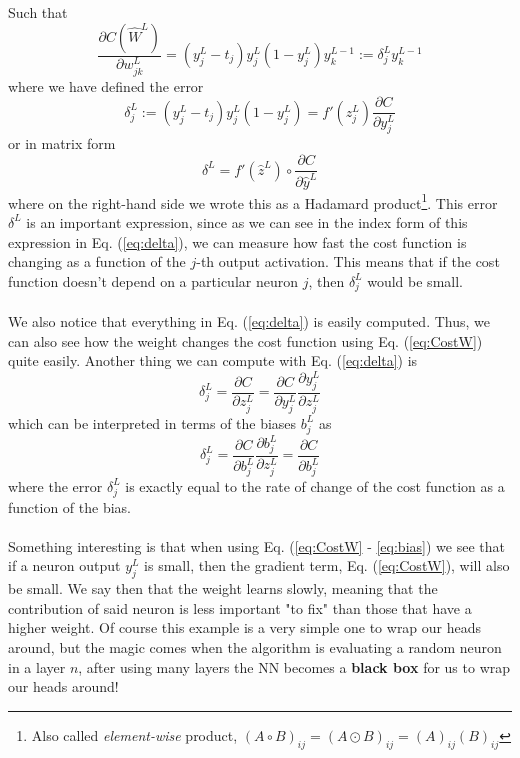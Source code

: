 \documentclass[12pt, a4paper]{book}
\begin{document}
Such that
\begin{equation}\label{eq:CostW}
    \frac{\partial C(\hat W ^L) }{\partial w_{jk}^L}=\left(y_j^L-t_j\right)y_j^L(1-y_j^L)y_k^{L-1} :=\delta_j^Ly_k^{L-1}
\end{equation}
where we have defined the error
\begin{equation}\label{eq:delta}
    \delta_j^L:=\left(y_j^L-t_j\right)y_j^L(1-y_j^L)=f'(z_j^L)\frac{\partial C}{\partial y_j^L} 
\end{equation}
or in matrix form
$$
\delta^L = f'(\hat z ^L)\circ \frac{\partial C}{\partial \hat y ^L}
$$
where on the right-hand side we wrote this as a Hadamard product\footnote{Also called \textit{element-wise} product, $(A\circ B)_{ij} = (A\odot B)_{ij} = (A)_{ij}(B)_{ij}$}. This error $\delta^L$ is an important expression, since as we can see in the index form of this expression in Eq. (\ref{eq:delta}), we can measure how fast 
the cost function is changing as a function of the $j$-th output activation. This means that if the cost function doesn't depend on a particular neuron $j$, then $\delta_j^L$ would be small.  \\
\\We also notice that everything in Eq. (\ref{eq:delta}) is easily computed. Thus, we can also see how the weight changes the cost function using Eq. (\ref{eq:CostW}) quite easily. 
Another thing we can compute with Eq. (\ref{eq:delta}) is
$$
\delta_j^L=\frac{\partial C}{\partial z_j^L} =\frac{\partial C}{\partial y_j^L}\frac{\partial y_j^L}{\partial z_j^L}
$$
which can be interpreted in terms of the biases $b_j^L$ as
\begin{equation}\label{eq:bias}
    \delta_j^L=\frac{\partial C}{\partial b_j^L}\frac{\partial b_j^L}{\partial z_j^L} = \frac{\partial C}{\partial b_j^L} 
\end{equation}
where the error $\delta_j^L$ is exactly equal to the rate of change of the cost function as a function of the bias.\\
\\Something interesting is that when using Eq. (\ref{eq:CostW} - \ref{eq:bias}) we see that if a neuron output $y_j^L$ is small, then the gradient term, Eq. (\ref{eq:CostW}), will also be small. We say then that the weight learns 
slowly, meaning that the contribution of said neuron is less important "to fix" than those that have a higher weight. Of course this example is a very simple one to wrap our heads around, but the magic comes when the algorithm is 
evaluating a random neuron in a layer $n$, after using many layers the NN becomes a \textbf{black box} for us to wrap our heads around!\\
\end{document}

